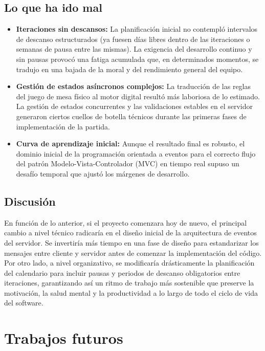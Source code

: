 \subsection{Lo que ha ido mal}

\begin{itemize}
\item \textbf{Iteraciones sin descansos:} La planificación inicial no contempló intervalos de descanso estructurados (ya fuesen días libres dentro de las iteraciones o semanas de pausa entre las mismas). La exigencia del desarrollo continuo y sin pausas provocó una fatiga acumulada que, en determinados momentos, se tradujo en una bajada de la moral y del rendimiento general del equipo.

\item \textbf{Gestión de estados asíncronos complejos:} La traducción de las reglas del juego de mesa físico al motor digital resultó más laboriosa de lo estimado. La gestión de estados concurrentes y las validaciones estables en el servidor generaron ciertos cuellos de botella técnicos durante las primeras fases de implementación de la partida.

\item \textbf{Curva de aprendizaje inicial:} Aunque el resultado final es robusto, el dominio inicial de la programación orientada a eventos para el correcto flujo del patrón Modelo-Vista-Controlador (MVC) en tiempo real supuso un desafío temporal que ajustó los márgenes de desarrollo.
\end{itemize}

\subsection{Discusión}

En función de lo anterior, si el proyecto comenzara hoy de nuevo, el principal cambio a nivel técnico radicaría en el diseño inicial de la arquitectura de eventos del servidor. Se invertiría más tiempo en una fase de diseño para estandarizar los mensajes entre cliente y servidor antes de comenzar la implementación del código. Por otro lado, a nivel organizativo, se modificaría drásticamente la planificación del calendario para incluir pausas y periodos de descanso obligatorios entre iteraciones, garantizando así un ritmo de trabajo más sostenible que preserve la motivación, la salud mental y la productividad a lo largo de todo el ciclo de vida del software.

\section{Trabajos futuros}

